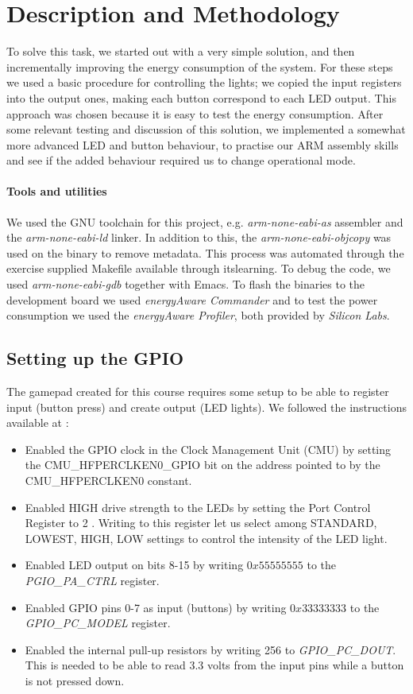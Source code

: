 \section{Description and Methodology}
\label{section:description_and_methodology}
To solve this task, we started out with a very simple solution, and then incrementally improving the energy consumption of the system. For these steps we used a basic procedure for controlling the lights; we copied the input registers into the output ones, making each button correspond to each LED output. This approach was chosen because it is easy to test the energy consumption. After some relevant testing and discussion of this solution, we implemented a somewhat more advanced LED and button behaviour, to practise our ARM assembly skills and see if the added behaviour required us to change operational mode. 

	\paragraph{Tools and utilities}
	We used the GNU toolchain for this project, e.g. \emph{arm-none-eabi-as} assembler and the \emph{arm-none-eabi-ld} linker. In addition to this, the \emph{arm-none-eabi-objcopy} was used on the binary to remove metadata. This process was automated through the exercise supplied Makefile available through itslearning. To debug the code, we used \emph{arm-none-eabi-gdb} together with Emacs. To flash the binaries to the development board we used \emph{energyAware Commander} and to test the power consumption we used the \emph{energyAware Profiler}, both provided by \emph{Silicon Labs}.
	\subsection{Setting up the GPIO}
	\label{subsection:gpio_setup}
	The gamepad created for this course requires some setup to be able to register input (button press) and create output (LED lights). We followed the instructions available at \cite[p. 24]{compendium}:
	
	\begin{itemize}
		\item Enabled the GPIO clock in the Clock Management Unit (CMU) by setting the CMU\_HFPERCLKEN0\_GPIO bit on the address pointed to by the CMU\_HFPERCLKEN0 constant.
		\item Enabled HIGH drive strength to the LEDs by setting the Port Control Register to 2 \cite[p. 766]{reference_manual}. Writing to this register let us select among STANDARD, LOWEST, HIGH, LOW settings to control the intensity of the LED light.
		\item Enabled LED output on bits 8-15 by writing $0x55555555$ to the \emph{PGIO\_PA\_CTRL} register.
		\item Enabled GPIO pins 0-7 as input (buttons) by writing $0x33333333$ to the \emph{GPIO\_PC\_MODEL} register.
		\item Enabled the internal pull-up resistors by writing 256 to \emph{GPIO\_PC\_DOUT}. This is needed to be able to read 3.3 volts from the input pins while a button is not pressed down. 
	\end{itemize}

